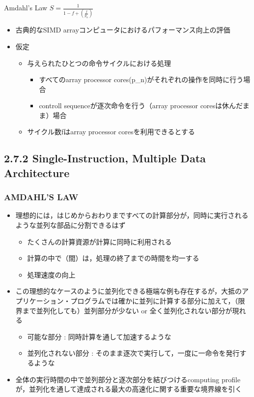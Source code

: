 \documentclass[12pt, unicode, dvipdfmx]{beamer}
\begin{document}
\begin{frame}[t]
	\begin{alertblock}{Amdahl's Law}
		\centering
		$S = \frac{1}{1-f+\left(\frac{f}{p_n}\right)}$
	\end{alertblock}

	\begin{itemize}
		\item 古典的なSIMD arrayコンピュータにおけるパフォーマンス向上の評価
		\item 仮定
		\begin{itemize}
			\item 与えられたひとつの命令サイクルにおける処理
			\begin{itemize}
				\item すべてのarray processor cores(p\_n)がそれぞれの操作を同時に行う場合
				\item controll sequenceが逐次命令を行う（array processor coresは休んだまま）場合
			\end{itemize}
			\item サイクル数fはarray processor coresを利用できるとする
		\end{itemize}
	\end{itemize}
\end{frame}

\subsection{2.7.2 Single-Instruction, Multiple Data Architecture}
\begin{frame}[t]
	\frametitle{AMDAHL'S LAW}
	\begin{itemize}
		\item 理想的には，はじめからおわりまですべての計算部分が，同時に実行されるような並列な部品に分割できるはず
		\begin{itemize}
			\item たくさんの計算資源が計算に同時に利用される
			\item 計算の中で（間）は，処理の終了までの時間を均一する
			\item 処理速度の向上
		\end{itemize}
		\item この理想的なケースのように並列化できる極端な例も存在するが，大抵のアプリケーション・プログラムでは確かに並列に計算する部分に加えて，（限界まで並列化しても）並列部分が少ない or 全く並列化されない部分が現れる
		\begin{itemize}
			\item 可能な部分 : 同時計算を通して加速するような
			\item 並列化されない部分 : そのまま逐次で実行して，一度に一命令を発行するような
		\end{itemize}
	\item 全体の実行時間の中で並列部分と逐次部分を結びつける\alert{computing profile}が，並列化を通して達成される最大の高速化に関する重要な境界線を引く
	\end{itemize}
\end{frame}
\end{document}
